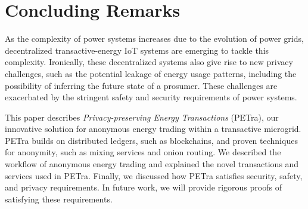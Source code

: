 \section{Concluding Remarks}
\label{sec:concl}

As the complexity of power systems increases due to the evolution of
power grids, decentralized transactive-energy IoT systems are emerging
to tackle this complexity. Ironically, these decentralized systems
also give rise to new privacy challenges, such as the potential leakage of energy usage patterns, including the possibility of inferring the future state of a prosumer.
These challenges are exacerbated by the stringent safety and
security requirements of power systems.

This paper describes 
\emph{Privacy-preserving Energy Transactions} (PETra), our
innovative solution for anonymous energy trading within a transactive
microgrid.  PETra builds on distributed ledgers, such as blockchains,
and proven techniques for anonymity, such as mixing services and onion
routing.  We described the workflow of anonymous energy trading and
explained the novel transactions and services used in PETra.  Finally,
we discussed how PETra satisfies security, safety, and privacy
requirements.  In future work, we will provide rigorous proofs of
satisfying these requirements.

